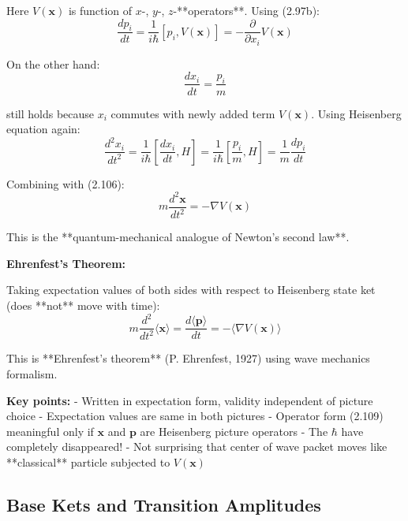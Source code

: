 \documentclass[11pt,a4paper]{article}
\begin{document}
Here $V(\mathbf{x})$ is function of $x$-, $y$-, $z$-**operators**. Using (2.97b):
\begin{equation}
\frac{dp_i}{dt} = \frac{1}{i\hbar}[p_i, V(\mathbf{x})] = -\frac{\partial}{\partial x_i}V(\mathbf{x})
\tag{2.106}
\end{equation}

On the other hand:
\begin{equation}
\frac{dx_i}{dt} = \frac{p_i}{m}
\tag{2.107}
\end{equation}

still holds because $x_i$ commutes with newly added term $V(\mathbf{x})$. Using Heisenberg equation again:
\begin{equation}
\frac{d^2x_i}{dt^2} = \frac{1}{i\hbar}\left[\frac{dx_i}{dt}, H\right] = \frac{1}{i\hbar}\left[\frac{p_i}{m}, H\right] = \frac{1}{m}\frac{dp_i}{dt}
\tag{2.108}
\end{equation}

Combining with (2.106):
\begin{equation}
\boxed{m\frac{d^2\mathbf{x}}{dt^2} = -\nabla V(\mathbf{x})}
\tag{2.109}
\end{equation}

This is the **quantum-mechanical analogue of Newton's second law**.

\textbf{Ehrenfest's Theorem:}

Taking expectation values of both sides with respect to Heisenberg state ket (does **not** move with time):
\begin{equation}
\boxed{m\frac{d^2}{dt^2}\langle\mathbf{x}\rangle = \frac{d\langle\mathbf{p}\rangle}{dt} = -\langle\nabla V(\mathbf{x})\rangle}
\tag{2.110}
\end{equation}

This is **Ehrenfest's theorem** (P. Ehrenfest, 1927) using wave mechanics formalism.

\textbf{Key points:}
- Written in expectation form, validity independent of picture choice
- Expectation values are same in both pictures
- Operator form (2.109) meaningful only if $\mathbf{x}$ and $\mathbf{p}$ are Heisenberg picture operators
- The $\hbar$ have completely disappeared!
- Not surprising that center of wave packet moves like **classical** particle subjected to $V(\mathbf{x})$

\subsection{Base Kets and Transition Amplitudes}
\end{document}
